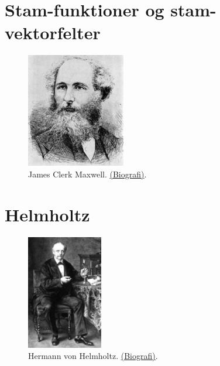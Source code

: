 


\section{Stam-funktioner og stam-vektorfelter}  \label{secStam}


\begin{figure}[h]
\centerline{\includegraphics[height=50mm]{FIGS/PERSMaxwell_8}}
\begin{center}
\caption{\small{James Clerk Maxwell. \href{http://www-history.mcs.st-and.ac.uk/Mathematicians/Maxwell.html}{(Biografi)}.}} \label{figMaxwell}
\end{center}
\end{figure}



\section{Helmholtz}  \label{secHelm}


\begin{figure}[h]
\centerline{\includegraphics[height=50mm]{FIGS/PERSHelmholtz}}
\begin{center}
\caption{\small{Hermann von Helmholtz. \href{http://www-history.mcs.st-and.ac.uk/Mathematicians/Helmholtz.html}{(Biografi)}.}} \label{figHelmholtz}
\end{center}
\end{figure}

